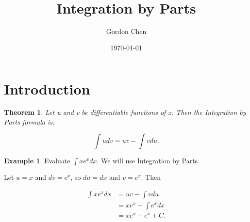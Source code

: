 \documentclass[12pt, letterpaper]{article}
\title{Integration by Parts}
\author{Gordon Chen}
\date{\today}
\newtheorem{thm}{Theorem}
\theoremstyle{definition}
\newtheorem{ex}{Example}
\begin{document}
\maketitle

\section{Introduction}
\begin{thm}
    Let u and v be differentiable functions of x. Then the Integration by Parts formula is:

    \[ \int u dv = uv - \int v du . \]
\end{thm}

\begin{ex}
    Evaluate \( \displaystyle{\int x e^x dx} \). We will use Integration by Parts.

    \noindent Let \( u=x \) and \( dv = e^x \), so \( du = dx \) and \( v = e^x \). Then

    \begin{align*}
        \int x e^x dx &= uv - \int v du \\
                      &= x e^x - \int e^x dx \\
                      &= x e^x - e^x +C . \\
    \end{align*}
\end{ex}
\end{document}
